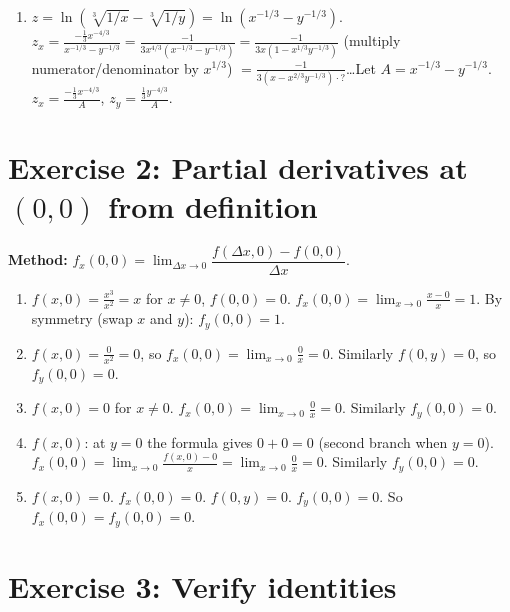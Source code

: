 \documentclass[12pt,a4paper]{article}
\begin{document}
\begin{enumerate}[leftmargin=*, label=(\alph*)]
\item $z=\ln(\sqrt[3]{1/x}-\sqrt[3]{1/y})=\ln(x^{-1/3}-y^{-1/3})$.
$z_x=\frac{-\frac{1}{3}x^{-4/3}}{x^{-1/3}-y^{-1/3}}=\frac{-1}{3x^{4/3}(x^{-1/3}-y^{-1/3})}=\frac{-1}{3x(1-x^{1/3}y^{-1/3})}$ (multiply numerator/denominator by $x^{1/3}$)
$=\frac{-1}{3(x-x^{2/3}y^{-1/3})\cdot ?}$\ldots Let $A=x^{-1/3}-y^{-1/3}$.
$z_x=\frac{-\frac{1}{3}x^{-4/3}}{A}$, $z_y=\frac{\frac{1}{3}y^{-4/3}}{A}$.

\end{enumerate}

\section*{Exercise 2: Partial derivatives at $(0,0)$ from definition}

\textbf{Method:} $f_x(0,0)=\lim_{\Delta x\to 0}\dfrac{f(\Delta x,0)-f(0,0)}{\Delta x}$.

\begin{enumerate}[leftmargin=*, label=(\alph*)]

\item $f(x,0)=\frac{x^3}{x^2}=x$ for $x\ne 0$, $f(0,0)=0$.
$f_x(0,0)=\lim_{x\to 0}\frac{x-0}{x}=1$.
By symmetry (swap $x$ and $y$): $f_y(0,0)=1$.

\item $f(x,0)=\frac{0}{x^2}=0$, so $f_x(0,0)=\lim_{x\to 0}\frac{0}{x}=0$.
Similarly $f(0,y)=0$, so $f_y(0,0)=0$.

\item $f(x,0)=0$ for $x\ne 0$. $f_x(0,0)=\lim_{x\to 0}\frac{0}{x}=0$.
Similarly $f_y(0,0)=0$.

\item $f(x,0)$: at $y=0$ the formula gives $0+0=0$ (second branch when $y=0$).
$f_x(0,0)=\lim_{x\to 0}\frac{f(x,0)-0}{x}=\lim_{x\to 0}\frac{0}{x}=0$.
Similarly $f_y(0,0)=0$.

\item $f(x,0)=0$. $f_x(0,0)=0$.
$f(0,y)=0$. $f_y(0,0)=0$.
So $f_x(0,0)=f_y(0,0)=0$.

\end{enumerate}

\section*{Exercise 3: Verify identities}
\end{document}
